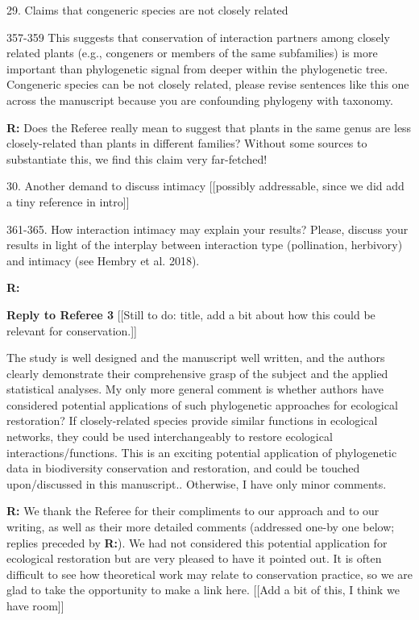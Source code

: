 \documentclass[12pt]{letter}
\newenvironment{refquote}{\bigskip \begin{it}}{\end{it}\smallskip}
\begin{document}
	29. Claims that congeneric species are not closely related

		\begin{refquote}
			357-359 This suggests that conservation of interaction partners among closely related plants (e.g., congeners or members of the same subfamilies) is more important than phylogenetic signal from deeper within the phylogenetic tree. Congeneric species can be not closely related, please revise sentences like this one across the manuscript because you are confounding phylogeny with taxonomy.
		\end{refquote}


		\textbf{R:} Does the Referee really mean to suggest that plants in the same genus are less closely-related than plants in different families? Without some sources to substantiate this, we find this claim very far-fetched!


	30. Another demand to discuss intimacy [[possibly addressable, since we did add a tiny reference in intro]]

		\begin{refquote}
			361-365. How interaction intimacy may explain your results? Please, discuss your results in light of the interplay between interaction type (pollination, herbivory) and intimacy (see Hembry et al. 2018).
		\end{refquote}


		\textbf{R:}


\clearpage

{\Large \bf Reply to Referee 3} [[Still to do: title, add a bit about how this could be relevant for conservation.]]

	\begin{refquote}
		The study is well designed and the manuscript well written, and the authors clearly demonstrate their comprehensive grasp of the subject and the applied statistical analyses.
		My only more general comment is whether authors have considered potential applications of such phylogenetic approaches for ecological restoration? If closely-related species provide similar functions in ecological networks, they could be used interchangeably to restore ecological interactions/functions. This is an exciting potential application of phylogenetic data in biodiversity conservation and restoration, and could be touched upon/discussed in this manuscript.. 
		Otherwise, I have only minor comments.
	\end{refquote}

	\textbf{R:} We thank the Referee for their compliments to our approach and to our writing, as well as their more detailed comments (addressed one-by one below; replies preceded by \textbf{R:}). We had not considered this potential application for ecological restoration but are very pleased to have it pointed out. It is often difficult to see how theoretical work may relate to conservation practice, so we are glad to take the opportunity to make a link here. [[Add a bit of this, I think we have room]]
\end{document}
